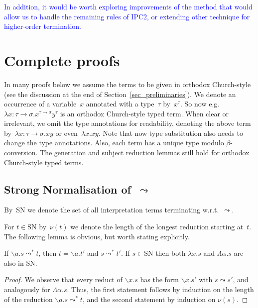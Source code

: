 \documentclass[a4paper,UKenglish,cleveref,autoref,numberwithinsect]{lipics-v2019}
\theoremstyle{definition}
\newcommand{\arrtype}{\rightarrow}
\newcommand{\abstraction}[2]{\backslash #1.#2}
\newcommand{\abs}[2]{\lambda #1.#2}
\newcommand{\tabs}[2]{\Lambda #1.#2}
\newcommand{\arrW}{\leadsto}
\newcommand{\SN}{\mathrm{SN}}
\newcommand{\CKchange}[1]{\textcolor{blue}{#1}}
\begin{document}
\CKchange{In addition, it would be worth exploring improvements of the method that
would allow us to handle the remaining rules of IPC2, or extending
other technique for higher-order termination. %
}



\clearpage
\appendix

\section{Complete proofs}\label{app_proofs}

In many proofs below we assume the terms to be given in orthodox
Church-style (see the discussion at the end of
Section~\ref{sec_preliminaries}). We denote an occurrence of a
variable~$x$ annotated with a type~$\tau$ by~$x^\tau$. So now
e.g.~$\lambda x : \tau\arrtype\sigma . x^{\tau\arrtype\sigma}y^\tau$
is an orthodox Church-style typed term. When clear or irrelevant, we
omit the type annotations for readability, denoting the above term
by~$\lambda x : \tau\arrtype\sigma . x y$ or even~$\lambda x . x
y$. Note that now type substitution also needs to change the type
annotations. Also, each term has a unique type modulo
$\beta$-conversion. The generation and subject reduction lemmas still
hold for orthodox Church-style typed terms.

\subsection{Strong Normalisation of~$\arrW$}

By~$\SN$ we denote the set of all interpretation terms terminating
w.r.t.~$\arrW$.

For $t \in \SN$ by~$\nu(t)$ we denote the length of the longest
reduction starting at~$t$. The following lemma is obvious, but worth
stating explicitly.

\begin{lemma}\label{lem_reduce_abs}
  If $\abstraction{a}{s} \arrW^* t$, then $t = \abstraction{a}{t'}$
  and $s \arrW^* t'$.  If $s \in \SN$ then both $\abs{x}{s}$ and
  $\tabs{\alpha}{s}$ are also in $\SN$.
\end{lemma}

\begin{proof}
  We observe that every reduct of $\abstraction{x}{s}$ has the form
  $\abstraction{x}{s'}$ with $s \arrW s'$, and analogously for
  $\tabs{\alpha}{s}$.  Thus, the first statement follows by induction
  on the length of the reduction $\abstraction{a}{s} \arrW^* t$,
  and the second statement by induction on $\nu(s)$.
\end{proof}
\end{document}

